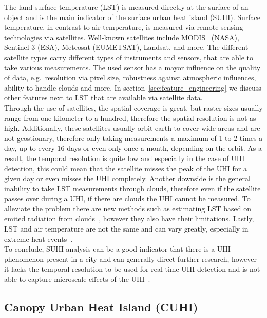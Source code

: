 The land surface temperature (LST) is measured directly at the surface of an object and is the main indicator of the surface urban heat island (SUHI). Surface temperature, in contrast to air temperature, is measured via remote sensing technologies via satellites. Well-known satellites include MODIS~\cite{didan2021modis} (NASA), Sentinel 3 (ESA), Meteosat (EUMETSAT), Landsat, and more. The different satellite types carry different types of instruments and sensors, that are able to take various measurements. The used sensor has a mayor influence on the quality of data, e.g.\ resolution via pixel size, robustness against atmospheric influences, ability to handle clouds and more. In section~\ref{sec:feature_engineering} we discuss other features next to LST that are available via satellite data.\\
Through the use of satellites, the spatial coverage is great, but raster sizes usually range from one kilometer to a hundred, therefore the spatial resolution is not as high.
Additionally, these satellites usually orbit earth to cover wide areas and are not geostionary, therefore only taking measurements a maximum of 1 to 2 times a day, up to every 16 days or even only once a month, depending on the orbit. As a result, the temporal resolution is quite low and especially in the case of UHI detection, this could mean that the satellite misses the peak of the UHI for a given day or even misses the UHI completely. Another downside is the general inability to take LST measurements through clouds, therefore even if the satellite passes over during a UHI, if there are clouds the UHI cannot be measured. To alleviate the problem there are new methods such as estimating LST based on emited radiation from clouds~\cite{zhang2015estimation}, however they also have their limitations. Lastly, LST and air temperature are not the same and can vary greatly, especially in extreme heat events~\cite{good2016situ}.\\
To conclude, SUHI analysis can be a good indicator that there is a UHI phenomenon present in a city and can generally direct further research, however it lacks the temporal resolution to be used for real-time UHI detection and is not able to capture microscale effects of the UHI~\cite{voogt2003thermal, voelkel2017towards}.

\subsection{Canopy Urban Heat Island (CUHI)}

